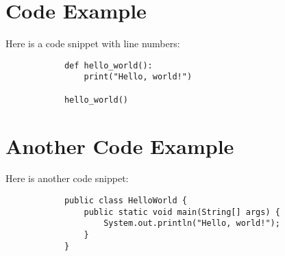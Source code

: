 \documentclass{article}
\begin{document}
    \section{Code Example}
        Here is a code snippet with line numbers:

        \begin{verbatim}
            def hello_world():
                print("Hello, world!")

            hello_world()
        \end{verbatim}

    \section{Another Code Example}
        Here is another code snippet:

        \begin{verbatim}
            public class HelloWorld {
                public static void main(String[] args) {
                    System.out.println("Hello, world!");
                }
            }
        \end{verbatim}
\end{document}
